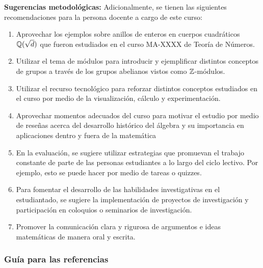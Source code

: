 \begin{refsection}
\textbf{Sugerencias metodológicas:} Adicionalmente, se tienen las siguientes recomendaciones para la persona docente a cargo de este curso:
\begin{enumerate}
    \item Aprovechar los ejemplos sobre anillos de enteros en cuerpos cuadráticos $\mathbb{Q}(\sqrt{d})$ que fueron estudiados en el curso MA-XXXX de Teoría de Números.
    \item Utilizar el tema de módulos para introducir y ejemplificar distintos conceptos de grupos a través de los grupos abelianos vistos como $\mathbb{Z}$-módulos.
    \item Utilizar el recurso tecnológico para reforzar distintos conceptos estudiados en el curso por medio de la visualización, cálculo y experimentación.
    \item Aprovechar momentos adecuados del curso para motivar el estudio por medio de reseñas acerca del desarrollo histórico del álgebra y su importancia en aplicaciones dentro y fuera de la matemática
    \item En la evaluación, se sugiere utilizar estrategias que promuevan el trabajo constante de parte de las personas estudiantes a lo largo del ciclo lectivo. Por ejemplo, esto se puede hacer por medio de tareas o quizzes.
    \item Para fomentar el desarrollo de las habilidades investigativas en el estudiantado, se sugiere la implementación de proyectos de investigación y participación en coloquios o seminarios de investigación.
    \item Promover la comunicación clara y rigurosa de argumentos e ideas matemáticas de manera oral y escrita.
\end{enumerate}


\subsubsection*{Guía para las referencias}


\end{refsection}
